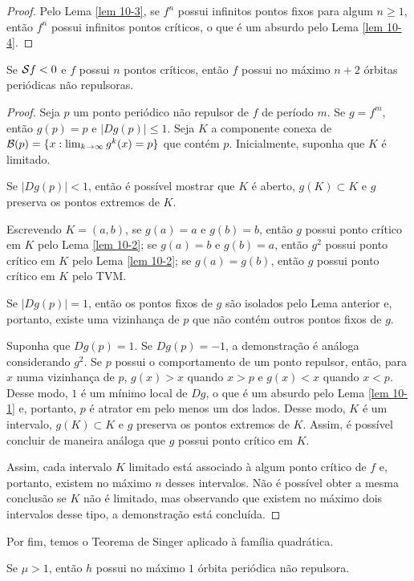 \begin{proof}
Pelo Lema \ref{lem 10-3}, se $f^n$ possui infinitos pontos fixos para algum $n \geq 1$, então $f^n$ possui infinitos pontos críticos, o que é um absurdo pelo Lema \ref{lem 10-4}.
\end{proof}

\begin{theorem}[Singer]
Se $\mathcal{S} f < 0$ e $f$ possui $n$ pontos críticos, então $f$ possui no máximo $n+2$ órbitas periódicas não repulsoras.
\end{theorem}

\begin{proof}
Seja $p$ um ponto periódico não repulsor de $f$ de período $m$.
Se $g = f^m$, então $g(p) = p$ e $|D g(p)| \leq 1$.
Seja $K$ a componente conexa de $\mathcal{B}(p) = \lbrace x : \lim_{k \to \infty} g^k(x) = p \rbrace$ que contém $p$.
Inicialmente, suponha que $K$ é limitado.

Se $|D g(p)| < 1$, então é possível mostrar que $K$ é aberto, $g(K) \subset K$ e $g$ preserva os pontos extremos de $K$.

Escrevendo $K = (a, b)$, se $g(a) = a$ e $g(b) = b$, então $g$ possui ponto crítico em $K$ pelo Lema \ref{lem 10-2}; se $g(a) = b$ e $g(b) = a$, então $g^2$ possui ponto crítico em $K$ pelo Lema \ref{lem 10-2}; se $g(a) = g(b)$, então $g$ possui ponto crítico em $K$ pelo TVM.

Se $|D g(p)| = 1$, então os pontos fixos de $g$ são isolados pelo Lema anterior e, portanto, existe uma vizinhança de $p$ que não contém outros pontos fixos de $g$.

Suponha que $D g(p) = 1$.
Se $D g(p) = -1$, a demonstração é análoga considerando $g^2$.
Se $p$ possui o comportamento de um ponto repulsor, então, para $x$ numa vizinhança de $p$, $g(x) > x$ quando $x > p$ e $g(x) < x$ quando $x < p$.
Desse modo, $1$ é um mínimo local de $D g$, o que é um absurdo pelo Lema \ref{lem 10-1} e, portanto, $p$ é atrator em pelo menos um dos lados.
Desse modo, $K$ é um intervalo, $g(K) \subset K$ e $g$ preserva os pontos extremos de $K$.
Assim, é possível concluir de maneira análoga que $g$ possui ponto crítico em $K$.

Assim, cada intervalo $K$ limitado está associado à algum ponto crítico de $f$ e, portanto, existem no máximo $n$ desses intervalos.
Não é possível obter a mesma conclusão se $K$ não é limitado, mas observando que existem no máximo dois intervalos desse tipo, a demonstração está concluída.
\end{proof}

Por fim, temos o Teorema de Singer aplicado à família quadrática.

\begin{corollary}
Se $\mu > 1$, então $h$ possui no máximo $1$ órbita periódica não repulsora.
\end{corollary}
